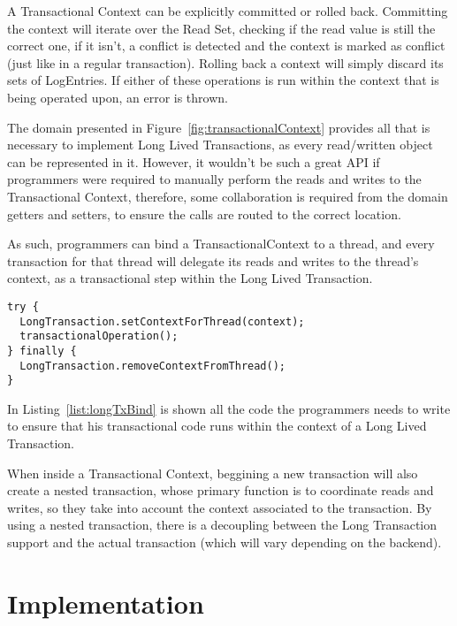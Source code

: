 A Transactional Context can be explicitly committed or rolled
back. Committing the context will iterate over the Read Set, checking
if the read value is still the correct one, if it isn't, a conflict is
detected and the context is marked as conflict (just like in a regular
transaction). Rolling back a context will simply discard its sets of
LogEntries. If either of these operations is run within the context
that is being operated upon, an error is thrown.

The domain presented in Figure~\ref{fig:transactionalContext} provides
all that is necessary to implement Long Lived Transactions, as every
read/written object can be represented in it. However, it wouldn't be
such a great API if programmers were required to manually perform the
reads and writes to the Transactional Context, therefore, some
collaboration is required from the domain getters and setters, to
ensure the calls are routed to the correct location.

As such, programmers can bind a TransactionalContext to a thread, and
every transaction for that thread will delegate its reads and writes
to the thread's context, as a transactional step within the Long Lived
Transaction. 

\begin{lstlisting}[caption={Example of TransactionalContext usage},
  label={list:longTxBind}]
try {
  LongTransaction.setContextForThread(context);
  transactionalOperation();
} finally {
  LongTransaction.removeContextFromThread();
}
\end{lstlisting}

In Listing~\ref{list:longTxBind} is shown all the code the programmers
needs to write to ensure that his transactional code runs within the
context of a Long Lived Transaction.

When inside a Transactional Context, beggining a new transaction will
also create a nested transaction, whose primary function is to
coordinate reads and writes, so they take into account the context
associated to the transaction. By using a nested transaction, there is
a decoupling between the Long Transaction support and the actual
transaction (which will vary depending on the backend).

\section{Implementation}
